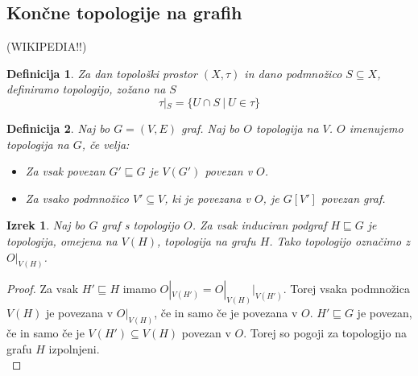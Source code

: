 \documentclass[mat1]{fmfdelo}
\newtheorem{definition}{Definicija}[subsection]
\newtheorem{theorem}{Izrek}[subsection]
\begin{document}
\subsection{Končne topologije na grafih}
(WIKIPEDIA!!)\\
\begin{definition}
  Za dan topološki prostor $(X, \tau)$ in dano podmnožico $S \subseteq X$, definiramo
  topologijo, zožano na $S$ \[\tau|_S = \{U \cap S\ |\ U \in \tau\}\]
\end{definition}
\begin{definition}
  Naj bo $G = (V,E)$ graf. Naj bo $O$ topologija na $V$. $O$ imenujemo topologija
  na $G$, če velja:
  \begin{itemize}
    \item[(1)] Za vsak povezan $G' \sqsubseteq G$ je $V(G')$ povezan v $O$.
    \item[(2)] Za vsako podmnožico $V' \subseteq V$, ki je povezana v $O$, je $G[V']$ povezan graf.
  \end{itemize}
\end{definition}
\begin{theorem}
  Naj bo $G$ graf s topologijo $O$. Za vsak induciran podgraf $H \sqsubseteq G$ je topologija,
  omejena na $V(H)$, topologija na grafu $H$. Tako topologijo označimo z $O|_{V(H)}$.
\end{theorem}
\begin{proof}
  Za vsak $H' \sqsubseteq H$ imamo $O|_{V(H')} = O|_{V(H)}|_{V(H')}$. Torej vsaka
  podmnožica $V(H)$ je povezana v $O|_{V(H)}$, če in samo če je povezana v $O$.
  $H' \sqsubseteq G$ je povezan, če in samo če je $V(H') \subseteq V(H)$ povezan v $O$.
  Torej so pogoji za topologijo na grafu $H$ izpolnjeni. \\
\end{proof}
\end{document}
